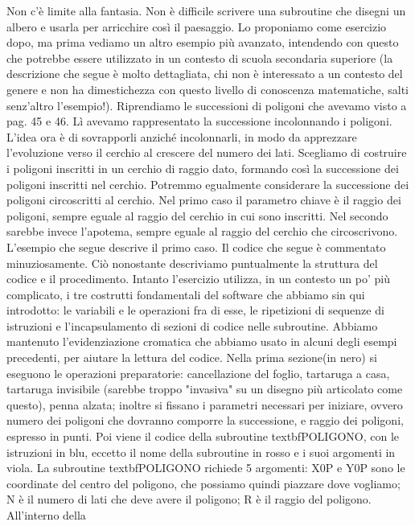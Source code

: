 Non c'è limite alla fantasia. Non è difficile scrivere una subroutine che disegni un albero e usarla per arricchire così il paesaggio. Lo proponiamo come esercizio dopo, ma prima vediamo un altro esempio più avanzato, intendendo con questo che potrebbe essere utilizzato in un contesto di scuola secondaria superiore (la descrizione che segue è molto dettagliata, chi non è interessato a un contesto del genere e non ha dimestichezza con questo livello di conoscenza matematiche, salti senz'altro l'esempio!). Riprendiamo le successioni di poligoni che avevamo visto a pag. 45 e 46. Lì avevamo rappresentato la successione incolonnando i poligoni. L'idea ora è di sovrapporli anziché incolonnarli, in modo da apprezzare l'evoluzione verso il cerchio al crescere del numero dei lati. Scegliamo di costruire i poligoni inscritti in un cerchio di raggio dato, formando così la successione dei poligoni inscritti nel cerchio. Potremmo egualmente considerare la successione dei poligoni circoscritti al cerchio. Nel primo caso il parametro chiave è il raggio dei poligoni, sempre eguale al raggio del cerchio in cui sono inscritti. Nel secondo sarebbe invece l'apotema, sempre eguale al raggio del cerchio che circoscrivono. L'esempio che segue descrive il primo caso. Il codice che segue è commentato minuziosamente. Ciò nonostante descriviamo puntualmente la struttura del codice e il procedimento. 
 Intanto l'esercizio utilizza, in un contesto un po' più complicato, i tre
 costrutti fondamentali del software che abbiamo sin qui introdotto: le
 variabili e le operazioni fra di esse, le ripetizioni di sequenze di
 istruzioni e l'incapsulamento di sezioni di codice nelle subroutine. Abbiamo
 mantenuto l'evidenziazione cromatica che abbiamo usato in alcuni degli esempi
 precedenti, per aiutare la lettura del codice. Nella prima sezione(in nero) si
 eseguono le operazioni preparatorie: cancellazione del foglio, tartaruga a
 casa, tartaruga invisibile (sarebbe troppo "invasiva" su un disegno più
 articolato come questo), penna alzata; inoltre si fissano i parametri
 necessari per iniziare, ovvero numero dei poligoni che dovranno comporre la
 successione, e raggio dei poligoni, espresso in punti. Poi viene il codice
 della subroutine textbf{POLIGONO}, con le istruzioni in blu, eccetto il nome
 della subroutine in rosso e i suoi argomenti in viola. La subroutine
 textbf{POLIGONO} richiede 5 argomenti: X0P e Y0P sono le coordinate del centro
 del poligono, che possiamo quindi piazzare dove vogliamo; N è il numero di
 lati che deve avere il poligono; R è il raggio del poligono. All'interno della
